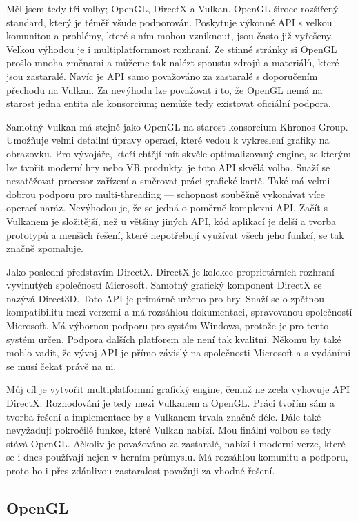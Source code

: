 \documentclass[12pt]{article}
\begin{document}
Měl jsem tedy tři volby; OpenGL, DirectX a Vulkan. OpenGL široce rozšířený standard, který je téměř všude podporován. Poskytuje výkonné API s velkou komunitou a problémy, které s ním mohou vzniknout, jsou často již vyřešeny. Velkou výhodou je i multiplatformnost rozhraní. Ze stinné stránky si OpenGL prošlo mnoha změnami a můžeme tak nalézt spoustu zdrojů a materiálů, které jsou zastaralé. Navíc je API samo považováno za zastaralé s doporučením přechodu na Vulkan. Za nevýhodu lze považovat i to, že OpenGL nemá na starost jedna entita ale konsorcium; nemůže tedy existovat oficiální podpora.

Samotný Vulkan má stejně jako OpenGL na starost konsorcium Khronos Group. Umožňuje velmi detailní úpravy operací, které vedou k vykreslení grafiky na obrazovku. Pro vývojáře, kteří chtějí mít skvěle optimalizovaný engine, se kterým lze tvořit moderní hry nebo VR produkty, je toto API skvělá volba. Snaží se nezatěžovat procesor zařízení a směrovat práci grafické kartě. Také má velmi dobrou podporu pro multi-threading — schopnost souběžně vykonávat více operací naráz. Nevýhodou je, že se jedná o poměrně komplexní API. Začít s Vulkanem je složitější, než u většiny jiných API, kód aplikací je delší a tvorba prototypů a menších řešení, které nepotřebují využívat všech jeho funkcí, se tak značně zpomaluje.

Jako poslední představím DirectX. DirectX je kolekce proprietárních rozhraní vyvinutých společností Microsoft. Samotný grafický komponent DirectX se nazývá Direct3D. Toto API je primárně určeno pro hry. Snaží se o zpětnou kompatibilitu mezi verzemi a má rozsáhlou dokumentaci, spravovanou společností Microsoft. Má výbornou podporu pro systém Windows, protože je pro tento systém určen. Podpora dalších platforem ale není tak kvalitní. Někomu by také mohlo vadit, že vývoj API je přímo závislý na společnosti Microsoft a s vydáními se musí čekat právě na ni.

Můj cíl je vytvořit multiplatformní grafický engine, čemuž ne zcela vyhovuje API DirectX. Rozhodování je tedy mezi Vulkanem a OpenGL. Práci tvořím sám a tvorba řešení a implementace by s Vulkanem trvala značně déle. Dále také nevyžaduji pokročilé funkce, které Vulkan nabízí. Mou finální volbou se tedy stává OpenGL. Ačkoliv je považováno za zastaralé, nabízí i moderní verze, které se i dnes používají nejen v herním průmyslu. Má rozsáhlou komunitu a podporu, proto ho i přes zdánlivou zastaralost považuji za vhodné řešení.

\subsection{OpenGL} \label{opengl}
\end{document}
